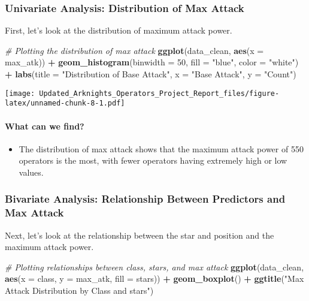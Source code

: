 \documentclass[
]{article}
\newenvironment{Shaded}{\begin{snugshade}}{\end{snugshade}}
\newcommand{\AttributeTok}[1]{\textcolor[rgb]{0.13,0.29,0.53}{#1}}
\newcommand{\CommentTok}[1]{\textcolor[rgb]{0.56,0.35,0.01}{\textit{#1}}}
\newcommand{\DecValTok}[1]{\textcolor[rgb]{0.00,0.00,0.81}{#1}}
\newcommand{\FunctionTok}[1]{\textcolor[rgb]{0.13,0.29,0.53}{\textbf{#1}}}
\newcommand{\NormalTok}[1]{#1}
\newcommand{\SpecialCharTok}[1]{\textcolor[rgb]{0.81,0.36,0.00}{\textbf{#1}}}
\newcommand{\StringTok}[1]{\textcolor[rgb]{0.31,0.60,0.02}{#1}}
\providecommand{\tightlist}{%
  \setlength{\itemsep}{0pt}\setlength{\parskip}{0pt}}
\begin{document}
\subsubsection{Univariate Analysis: Distribution of Max
Attack}\label{univariate-analysis-distribution-of-max-attack}

First, let's look at the distribution of maximum attack power.

\begin{Shaded}
\begin{Highlighting}[]
\CommentTok{\# Plotting the distribution of max attack}
\FunctionTok{ggplot}\NormalTok{(data\_clean, }\FunctionTok{aes}\NormalTok{(}\AttributeTok{x =}\NormalTok{ max\_atk)) }\SpecialCharTok{+}
  \FunctionTok{geom\_histogram}\NormalTok{(}\AttributeTok{binwidth =} \DecValTok{50}\NormalTok{, }\AttributeTok{fill =} \StringTok{"blue"}\NormalTok{, }\AttributeTok{color =} \StringTok{"white"}\NormalTok{) }\SpecialCharTok{+}
  \FunctionTok{labs}\NormalTok{(}\AttributeTok{title =} \StringTok{"Distribution of Base Attack"}\NormalTok{, }\AttributeTok{x =} \StringTok{"Base Attack"}\NormalTok{, }\AttributeTok{y =} \StringTok{"Count"}\NormalTok{)}
\end{Highlighting}
\end{Shaded}

\texttt{[image: Updated\_Arknights\_Operators\_Project\_Report\_files/figure-latex/unnamed-chunk-8-1.pdf]}

\paragraph{What can we find?}\label{what-can-we-find}

\begin{itemize}
\tightlist
\item
  The distribution of max attack shows that the maximum attack power of
  550 operators is the most, with fewer operators having extremely high
  or low values.
\end{itemize}

\subsubsection{Bivariate Analysis: Relationship Between Predictors and
Max
Attack}\label{bivariate-analysis-relationship-between-predictors-and-max-attack}

Next, let's look at the relationship between the star and position and
the maximum attack power.

\begin{Shaded}
\begin{Highlighting}[]
\CommentTok{\# Plotting relationships between class, stars, and max attack}
\FunctionTok{ggplot}\NormalTok{(data\_clean, }\FunctionTok{aes}\NormalTok{(}\AttributeTok{x =}\NormalTok{ class, }\AttributeTok{y =}\NormalTok{ max\_atk, }\AttributeTok{fill =}\NormalTok{ stars)) }\SpecialCharTok{+} 
  \FunctionTok{geom\_boxplot}\NormalTok{() }\SpecialCharTok{+} 
  \FunctionTok{ggtitle}\NormalTok{(}\StringTok{"Max Attack Distribution by Class and stars"}\NormalTok{)}
\end{Highlighting}
\end{Shaded}
\end{document}

